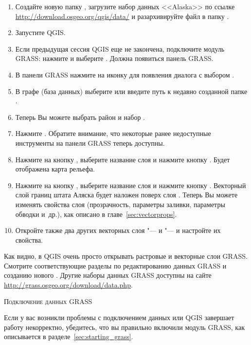 \begin{enumerate}
  \item Создайте новую папку , загрузите набор
  данных <<Alaska>>  по ссылке
  \url{http://download.osgeo.org/qgis/data/} и разархивируйте файл в
  папку .
  \item Запустите QGIS.
  \item Если предыдущая сессия QGIS еще не закончена, подключите
  модуль GRASS: нажмите  \arrow {} и выберите . Должна появиться панель
  GRASS.
  \item В панели GRASS нажмите на иконку
   для появления диалога
  с выбором .
  \item В графе  (база данных) выберите или введите
  путь к недавно созданной папке .
  \item Теперь Вы можете выбрать район  и набор
  .
  \item Нажмите . Обратите внимание, что некоторые ранее
  недоступные инструменты на панели GRASS теперь доступны.
  \item Нажмите на кнопку , выберите название слоя 
  и нажмите кнопку . Будет отображена карта рельефа.
  \item Нажмите на кнопку , выберите название слоя 
  и нажмите кнопку . Векторный слой границ штата Аляска
  будет наложен поверх слоя . Теперь Вы можете
  изменять свойства слоя (прозрачность, параметры заливки, параметры
  обводки и~др.), как описано в главе~\ref{sec:vectorprops}.
  \item Откройте также два других векторных слоя "--- 
  и  "--- и настройте их свойства.
\end{enumerate}

Как видно, в QGIS очень просто открывать растровые и векторные слои
GRASS. Смотрите соответствующие разделы по редактированию данных GRASS
и созданию нового . Другие наборы данных GRASS
доступны на сайте \url{http://grass.osgeo.org/download/data.php}.

\begin{Tip}\caption{\textsc{Подключение данных GRASS}}
Если у вас возникли проблемы с подключением данных или QGIS завершает
работу некорректно, убедитесь, что вы правильно включили модуль GRASS,
как описывается в разделе~\ref{sec:starting_grass}.
\end{Tip}

